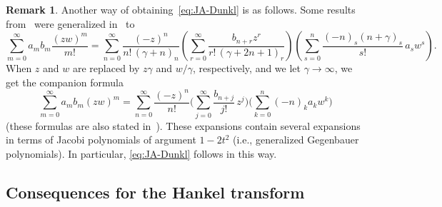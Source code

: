 \documentclass[11pt,a4paper]{amsart}
\theoremstyle{plain}
\theoremstyle{definition}
\newtheorem{Rem}{Remark}
\begin{document}
\begin{Rem}
Another way of obtaining~\eqref{eq:JA-Dunkl} is as follows. 
Some results from~\cite{FW} were generalized in~\cite{Ve} to
\begin{equation*}
  \sum_{m=0}^{\infty} a_mb_m \frac{(zw)^m}{m!} 
  = \sum_{n=0}^{\infty} \frac{(-z)^n}{n!\, (\gamma+n)_n} 
  \left( \sum_{r=0}^\infty \frac{b_{n+r}z^r}{r!\,(\gamma+2n+1)_r} \right) 
  \left( \sum_{s=0}^n \frac{(-n)_s (n+\gamma)_s}{s!} \,a_s w^s \right).
\end{equation*}
When $z$ and $w$ are replaced by $z\gamma$ and $w/\gamma$, respectively, 
and we let $\gamma \to \infty$, we get the
companion formula
\begin{equation*}
  \sum_{m=0}^{\infty} a_mb_m (zw)^m = \sum_{n=0}^{\infty} \frac{(-z)^n}{n!}
  \Biggl( \sum_{j=0}^\infty \frac{b_{n+j}}{j!} \, z^j \Biggr) 
  \Biggl( \sum_{k=0}^n (-n)_k a_k w^k \Biggr)
\end{equation*}
(these formulas are also stated in~\cite[Ch.~9]{Ism}).
These expansions contain several expansions in terms of Jacobi polynomials 
of argument $1 - 2t^2$ (i.e., generalized Gegenbauer polynomials). 
In particular, \eqref{eq:JA-Dunkl} follows in this way.
\end{Rem}


\subsection{Consequences for the Hankel transform}
\end{document}
